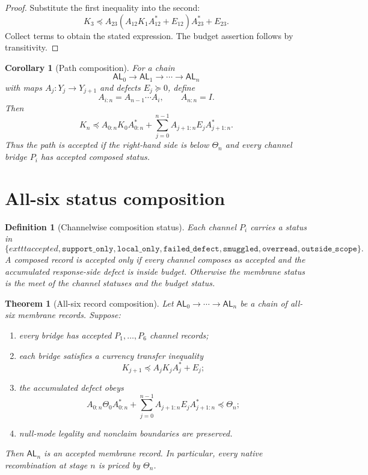 \documentclass[11pt]{article}
\newtheorem{theorem}{Theorem}
\newtheorem{corollary}{Corollary}
\newtheorem{definition}{Definition}
\begin{document}
\begin{proof}
Substitute the first inequality into the second:
\[
K_3\preceq A_{23}(A_{12}K_1A_{12}^*+E_{12})A_{23}^*+E_{23}.
\]
Collect terms to obtain the stated expression. The budget assertion follows by transitivity.
\end{proof}

\begin{corollary}[Path composition]
For a chain
\[
\mathsf{AL}_0\to\mathsf{AL}_1\to\cdots\to\mathsf{AL}_n
\]
with maps $A_j:Y_j\to Y_{j+1}$ and defects $E_j\succeq0$, define
\[
A_{i:n}=A_{n-1}\cdots A_i,
\qquad A_{n:n}=I.
\]
Then
\[
K_n\preceq A_{0:n}K_0A_{0:n}^*+
\sum_{j=0}^{n-1} A_{j+1:n}E_jA_{j+1:n}^*.
\]
Thus the path is accepted if the right-hand side is below $\Theta_n$ and every channel bridge $P_i$ has accepted composed status.
\end{corollary}

\section{All-six status composition}

\begin{definition}[Channelwise composition status]
Each channel $P_i$ carries a status in
\[
\{	exttt{accepted},\texttt{support\_only},\texttt{local\_only},\texttt{failed\_defect},\texttt{smuggled},\texttt{overread},\texttt{outside\_scope}\}.
\]
A composed record is accepted only if every channel composes as accepted and the accumulated response-side defect is inside budget. Otherwise the membrane status is the meet of the channel statuses and the budget status.
\end{definition}

\begin{theorem}[All-six record composition]
Let $\mathsf{AL}_0\to\cdots\to\mathsf{AL}_n$ be a chain of all-six membrane records. Suppose:
\begin{enumerate}[label=(\roman*)]
\item every bridge has accepted $P_1,\ldots,P_6$ channel records;
\item each bridge satisfies a currency transfer inequality
\[
K_{j+1}\preceq A_jK_jA_j^*+E_j;
\]
\item the accumulated defect obeys
\[
A_{0:n}\Theta_0A_{0:n}^*+
\sum_{j=0}^{n-1}A_{j+1:n}E_jA_{j+1:n}^*
\preceq \Theta_n;
\]
\item null-mode legality and nonclaim boundaries are preserved.
\end{enumerate}
Then $\mathsf{AL}_n$ is an accepted membrane record. In particular, every native recombination at stage $n$ is priced by $\Theta_n$.
\end{theorem}
\end{document}
